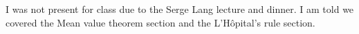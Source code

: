
















I was not present for class due to the Serge Lang lecture and dinner. I am told we covered the Mean value theorem section and the L'H\^opital's rule section.